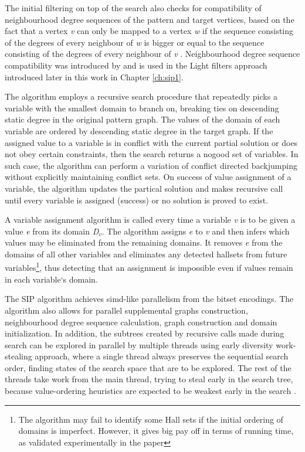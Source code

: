 \documentclass{l4proj}
\begin{document}
The initial filtering on top of the search also checks for compatibility of neighbourhood degree sequences of the pattern and target vertices, based on the fact that a vertex \emph{v} can only be mapped to a vertex \emph{w} if the sequence consisting of the degrees of every neighbour of \emph{w} is bigger or equal to the sequence consisting of the degrees of every neighbour of \emph{v} \cite{Solnon:2010}. Neighbourhood degree sequence compatibility was introduced by \cite{Solnon:2010} and is used in the Light filters approach introduced later in this work in Chapter \ref{ch:sip1}. 

The algorithm employs a recursive search procedure that repeatedly picks a variable with the smallest domain to branch on, breaking ties on descending static degree in the original pattern graph. The values of the domain of each variable are ordered by descending static degree in the target graph. If the assigned value to a variable is in conflict with the current partial solution or does not obey certain constraints, then the search returns a nogood set of variables. In such case, the algorithm can perform a variation of conflict directed backjumping \cite{Prosser:1993} without explicitly maintaining conflict sets. On success of value assignment of a variable, the algorithm updates the partical solution and makes recursive call until every variable is assigned (success) or no solution is proved to exist. 

A variable assignment algorithm is called every time a variable \emph{v} is to be given a value \emph{e} from its domain \emph{D$_{v}$}. The algorithm assigns \emph{e} to \emph{v} and then infers which values may be eliminated from the remaining domains. It removes \emph{e} from the domains of all other variables and eliminates any detected \glspl{hallset} from future variables\footnote{The algorithm may fail to identify some Hall sets if the initial ordering of domains is imperfect. However, it gives big pay off in terms of running time, as validated experimentally in the paper}, thus detecting that an assignment is impossible even if values remain in each variable`s domain.

The SIP algorithm achieves \gls{simd}-like parallelism from the bitset encodings. The algorithm also allows for parallel supplemental graphs construction, neighbourhood degree sequence calculation, graph construction and domain initialization. In addition, the subtrees created by recursive calls made during search can be explored in parallel by multiple threads using early diversity work-stealing approach, where a single thread always preserves the sequential search order, finding states of the search space that are to be explored. The rest of the threads take work from the main thread, trying to steal early in the search tree, because value-ordering heuristics are expected to be weakest early in the search \cite{Harvey:1995}.
\end{document}
